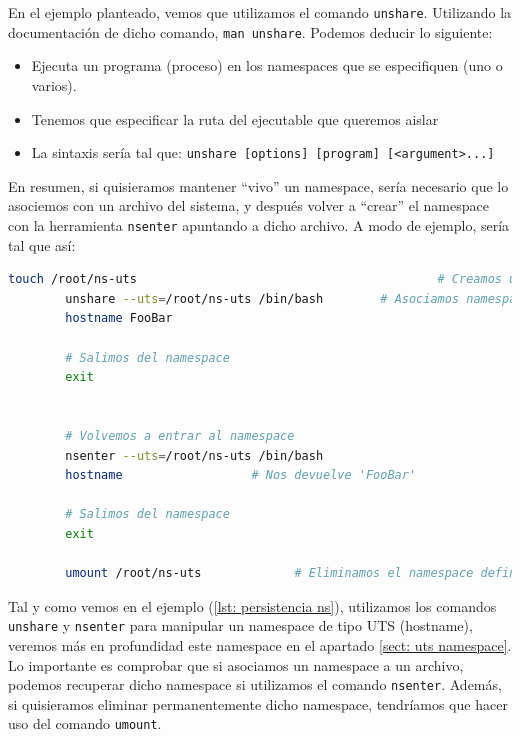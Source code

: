 \documentclass[a4paper, oneside, 12pt]{book}
\begin{document}

	\par \noindent En el ejemplo planteado, vemos que utilizamos el comando \texttt{unshare}. Utilizando la documentación de dicho comando, \texttt{man unshare}. Podemos deducir lo siguiente:
	\begin{itemize}
		\item Ejecuta un programa (proceso) en los namespaces que se especifiquen (uno o varios).
		\item Tenemos que especificar la ruta del ejecutable que queremos aislar
		\item La sintaxis sería tal que: \texttt{unshare [options] [program] [<argument>...]}
	\end{itemize}

	\noindent En resumen, si quisieramos mantener ``vivo'' un namespace, sería necesario que lo asociemos con un archivo del sistema, y después volver a ``crear'' el namespace con la herramienta \texttt{nsenter} apuntando a dicho archivo. A modo de ejemplo, sería tal que así:
	
	\begin{lstlisting}[language=Bash, label=lst: persistencia ns, caption=Ejemplo de un persistencia namespace]
		touch /root/ns-uts											# Creamos un archivo
		unshare --uts=/root/ns-uts /bin/bash		# Asociamos namespace UTS al archivo
		hostname FooBar
		
		# Salimos del namespace
		exit
		
		
		# Volvemos a entrar al namespace
		nsenter --uts=/root/ns-uts /bin/bash
		hostname                  # Nos devuelve 'FooBar'
		
		# Salimos del namespace
		exit
		
		umount /root/ns-uts 			# Eliminamos el namespace definitivamente
	\end{lstlisting}
	
	\vspace{10px}
	
	\noindent Tal y como vemos en el ejemplo (\ref{lst: persistencia ns}), utilizamos los comandos \texttt{unshare} y \texttt{nsenter} para manipular un namespace de tipo UTS (hostname), veremos más en profundidad este namespace en el apartado \ref{sect: uts namespace}. Lo importante es comprobar que si asociamos un namespace a un archivo, podemos recuperar dicho namespace si utilizamos el comando \texttt{nsenter}. Además, si quisieramos eliminar permanentemente dicho namespace, tendríamos que hacer uso del comando \texttt{umount}.
	
\end{document}
